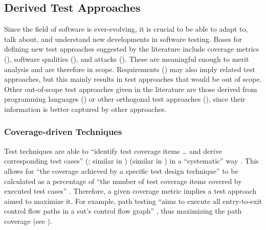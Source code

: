     \subsection{Derived Test Approaches}
    \label{derived-tests}

    Since the field of software is ever-evolving, it is crucial to be able to
    adapt to, talk about, and understand new developments in software testing.
    Bases for defining new test approaches suggested by the
    literature include coverage metrics (), software qualities
    (), and attacks (). These are meaningful
    enough to merit analysis and are therefore in scope. Requirements
    () may also imply related test approaches, but this mainly
    results in test approaches that would be out of scope. Other out-of-scope
    test approaches given in the literature are those derived from programming
    languages () or other orthogonal test approaches
    (), since their information is better captured by other
    approaches.

    \subsubsection{Coverage-driven Techniques}
    \label{cov-test}

    Test techniques are able to ``identify test coverage items \dots{} and
    derive corresponding test cases''
    \ifnotpaper
        (\citealp[p.~11]{IEEE2022}; similar in \citeyear[p.~467]{IEEE2017})
    \else
        \cite[p.~11]{IEEE2022} (similar in \cite[p.~467]{IEEE2017})
    \fi
    in a ``systematic'' way
    \citeyearpar[p.~464]{IEEE2017}.
    \ifnotpaper
        This allows for ``the coverage achieved by a specific test design
        technique'' to be calculated as a percentage of ``the number of test
        coverage items covered by executed test cases'' \citeyearpar[p.~30]{IEEE2021}.
    \fi %
    Therefore, a given coverage metric implies a test approach aimed to
    maximize it. For example, path testing ``aims to execute all entry-to-exit
    control flow paths in a \acs{sut}'s control flow graph'' \citep[p.~5-13]{SWEBOK2024},
    thus maximizing the path coverage
    \ifnotpaper
        \citep[see][Fig.~1]{SharmaEtAl2021}\else
        (see \cite[Fig.~1]{SharmaEtAl2021})\fi.

